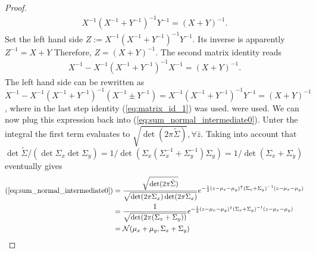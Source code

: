 \begin{proof}
{\begin{align} \label{eq:matrix_id_1}
X^{-1}(X^{-1} + Y^{-1})^{-1}Y^{-1} = (X+Y)^{-1}.
\end{align}
Set the left hand side $Z:=X^{-1}(X^{-1} + Y^{-1})^{-1}Y^{-1}$. Its inverse is apparently $Z^{-1} =  X + Y$ Therefore,  $Z =  (X + Y)^{-1}$. The second matrix identity reads
\begin{align} 
X^{-1}  - X^{-1}(X^{-1} + Y^{-1})^{-1}X^{-1} = (X+Y)^{-1}.
\end{align}
The left hand side can be rewritten as $X^{-1}  - X^{-1}(X^{-1} + Y^{-1})^{-1}(X^{-1}\pm Y^{-1}) = X^{-1}(X^{-1} + Y^{-1})^{-1}Y^{-1} = (X+Y)^{-1 }$, where in the last step identity (\ref{eq:matrix_id_1}) was used.} were used. We can now plug this expression back into (\ref{eq:sum_normal_intermediate0}). Unter the integral the first term evaluates to $\sqrt{\det(2\pi\tilde\Sigma)}, \forall \bar z$. Taking into account that $\det\tilde \Sigma /  (\det\Sigma_x\det  \Sigma_y) = 1 / \det(\Sigma_x(\Sigma_x^{-1}+\Sigma_y^{-1})\Sigma_y) = 1/\det(\Sigma_x+\Sigma_y)$ eventually gives 
\begin{align}
 (\ref{eq:sum_normal_intermediate0})  
 &= 
 \frac{\sqrt{\det(2\pi\tilde\Sigma)}}{\sqrt{\det(2\pi\Sigma_x)\det(2\pi\Sigma_x)}} 
  e^{-\frac{1}{2} (z-\mu_x - \mu_y)^\intercal (\Sigma_x + \Sigma_y)^{-1}(z-\mu_x - \mu_y) } \\ 
  &=\frac{1}{\sqrt{\det(2\pi(\Sigma_x+\Sigma_y))}} e^{-\frac{1}{2} (z-\mu_x - \mu_y)^\intercal (\Sigma_x + \Sigma_y)^{-1}(z-\mu_x - \mu_y) }  \\
  &= \mathcal{N}(\mu_x + \mu_y, \Sigma_x + \Sigma_y)
\end{align}
\end{proof}
